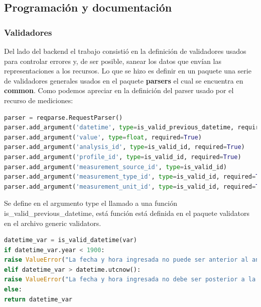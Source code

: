 \subsection{Programación y documentación}


\subsubsection{Validadores}
Del lado del backend el trabajo consistió en la definición de validadores usados para controlar errores y, de ser posible, sanear los datos que envían las representaciones a los recursos. Lo que se hizo es definir en un paquete una serie de validadores generales usados en el paquete \textbf{parsers} el cual se encuentra en \textbf{common}. Como podemos apreciar en la definición del parser usado por el recurso de mediciones:

\begin{lstlisting}[language=Python]
parser = reqparse.RequestParser()
parser.add_argument('datetime', type=is_valid_previous_datetime, required=True)
parser.add_argument('value', type=float, required=True)
parser.add_argument('analysis_id', type=is_valid_id, required=True)
parser.add_argument('profile_id', type=is_valid_id, required=True)
parser.add_argument('measurement_source_id', type=is_valid_id)
parser.add_argument('measurement_type_id', type=is_valid_id, required=True)
parser.add_argument('measurement_unit_id', type=is_valid_id, required=True)
\end{lstlisting}

Se define en el argumento type el llamado a una función is\_valid\_previous\_datetime, está función está definida en el paquete validators en el archivo generic validators.

\begin{lstlisting}[language=Python]
datetime_var = is_valid_datetime(var)
if datetime_var.year < 1900:
raise ValueError("La fecha y hora ingresada no puede ser anterior al anio 1900.")
elif datetime_var > datetime.utcnow():
raise ValueError("La fecha y hora ingresada no debe ser posterior a la fecha y hora actual.")
else:
return datetime_var
\end{lstlisting}

